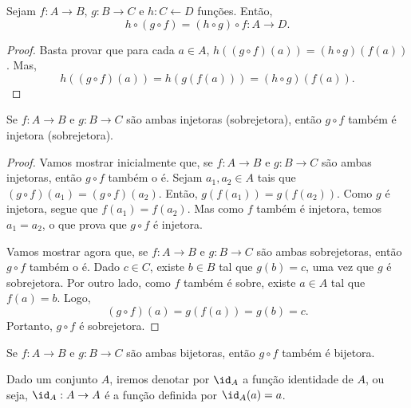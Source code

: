 \begin{proposition}
Sejam $f:A\rightarrow B$, $g:B \rightarrow C$ e $h:C\leftarrow D$
fun\c{c}\~oes. Ent\~ao,
$$
h\circ(g \circ f)=(h \circ g)\circ f:A \rightarrow D.
$$
\end{proposition}
\begin{proof}
Basta provar que para cada $a \in A$, $h((g \circ f)(a))=(h \circ
g)(f(a))$. Mas,
$$
h((g \circ f)(a))=h(g(f(a)))=(h \circ g)(f(a)).
$$
\end{proof}
\begin{theorem}
Se $f:A \rightarrow B$ e $g:B \rightarrow C$ s\~ao ambas injetoras
(sobrejetora), ent\~ao $g \circ f$ tamb\'em \'e injetora (sobrejetora).
\end{theorem}
\begin{proof}
Vamos mostrar inicialmente que, se $f:A \rightarrow B$ e $g:B
\rightarrow C$ s\~ao ambas injetoras, ent\~ao $g \circ f$ tamb\'em o \'e.
Sejam $a_1, a_2 \in A$ tais que $(g \circ f)(a_1)=(g \circ
f)(a_2)$. Ent\~ao, $g(f(a_1))=g(f(a_2))$. Como $g$ \'e injetora, segue
que $f(a_1)=f(a_2)$. Mas como $f$ tamb\'em \'e injetora, temos
$a_1=a_2$, o que prova que $g \circ f$ \'e injetora.

Vamos mostrar agora que, se $f:A \rightarrow B$ e $g:B \rightarrow
C$ s\~ao ambas sobrejetoras, ent\~ao $g \circ f$ tamb\'em o \'e. Dado $c
\in C$, existe $b \in B$ tal que $g(b)=c$, uma vez que $g$ \'e
sobrejetora. Por outro lado, como $f$ tamb\'em \'e sobre, existe $a \in A$
tal que $f(a)=b$. Logo,
$$
(g \circ f)(a)=g(f(a))=g(b)=c.
$$
Portanto, $g \circ f$ \'e sobrejetora.
\end{proof}
\begin{corollary}\label{comp-bi}
Se $f:A \rightarrow B$ e $g:B \rightarrow C$ s\~ao ambas bijetoras,
ent\~ao $g \circ f$ tamb\'em \'e bijetora.
\end{corollary}

Dado um conjunto $A$, iremos denotar por $\id_A$ a fun\c{c}\~ao
identidade de $A$, ou seja, $\id_A:A \rightarrow A$ \'e a fun\c{c}\~ao
definida por $\id_A(a)=a$.

